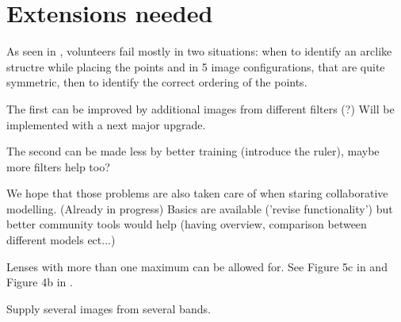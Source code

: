 \section{Extensions needed} \label{sec:todo}

As seen in , volunteers fail mostly in two situations:
when to identify an arclike structre while placing the points
and in 5 image configurations, that are quite symmetric, then to identify the correct ordering of the points.

The first can be improved by additional images from different filters (?)
Will be implemented with a next major \spl upgrade.

The second can be made less by better training (introduce the ruler), maybe more filters help too?

We hope that those problems are also taken care of when staring collaborative modelling. (Already in progress)
Basics are available ('revise functionality') but better community tools would help (having overview, comparison between different models ect...)

Lenses with more than one maximum can be allowed for.  See Figure 5c
in \citep{2001ApJ...557..594R} and Figure 4b in
\cite{2003ApJ...590...39K}.

Supply several images from several bands.
